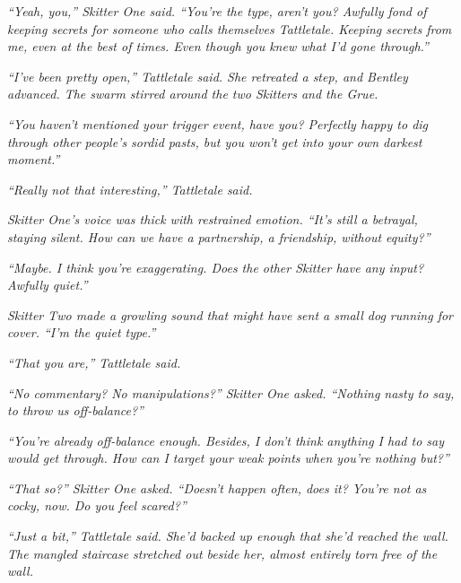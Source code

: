\emph{``Yeah, you,'' Skitter One said.  ``You're the type, aren't you?  Awfully fond of keeping secrets for someone who calls themselves Tattletale.  Keeping secrets from me, even at the best of times.  Even though you knew what I'd gone through.''}



\emph{``I've been pretty open,'' Tattletale said.  She retreated a step, and Bentley advanced.  The swarm stirred around the two Skitters and the Grue.}



\emph{``You haven't mentioned your trigger event, have you?  Perfectly happy to dig through other people's sordid pasts, but you won't get into your own darkest moment.''}



\emph{``Really not that interesting,'' Tattletale said.}



\emph{Skitter One's voice was thick with restrained emotion.  ``It's still a betrayal, staying silent.  How can we have a partnership, a friendship, without equity?''}



\emph{``Maybe.  I think you're exaggerating.  Does the other Skitter have any input?  Awfully quiet.''}



\emph{Skitter Two made a growling sound that might have sent a small dog running for cover.  ``I'm the quiet type.''}



\emph{``That you are,'' Tattletale said.}



\emph{``No commentary?  No manipulations?'' Skitter One asked.  ``Nothing nasty to say, to throw us off-balance?''}



\emph{``You're already off-balance enough.  Besides, I don't think anything I had to say would get through.  How can I target your weak points when you're nothing but?''}



\emph{``That so?'' Skitter One asked.  ``Doesn't happen often, does it?  You're not as cocky, now.  Do you feel scared?''}



\emph{``Just a bit,'' Tattletale said.  She'd backed up enough that she'd reached the wall.  The mangled staircase stretched out beside her, almost entirely torn free of the wall.}



